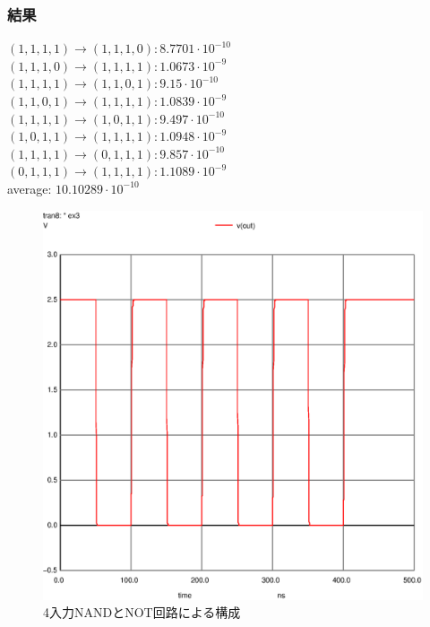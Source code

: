 \documentclass{jsarticle}
\begin{document}
\subsubsection{結果}
\begin{flushleft}
$(1,1,1,1) \rightarrow (1,1,1,0) : 8.7701 \cdot 10^{-10}$\\
$(1,1,1,0) \rightarrow (1,1,1,1) : 1.0673 \cdot 10^{-9}$\\
$(1,1,1,1) \rightarrow (1,1,0,1) : 9.15 \cdot 10^{-10}$\\
$(1,1,0,1) \rightarrow (1,1,1,1) : 1.0839 \cdot 10^{-9}$\\
$(1,1,1,1) \rightarrow (1,0,1,1) : 9.497 \cdot 10^{-10}$\\
$(1,0,1,1) \rightarrow (1,1,1,1) : 1.0948 \cdot 10^{-9}$\\
$(1,1,1,1) \rightarrow (0,1,1,1) : 9.857 \cdot 10^{-10}$\\
$(0,1,1,1) \rightarrow (1,1,1,1) : 1.1089 \cdot 10^{-9}$\\
average: $10.10289 \cdot 10^{-10}$

\end{flushleft}
\begin{figure}[H]
    \hspace{50pt}
    \includegraphics[scale=0.8]{ex3.ps}
    \vspace{30pt}
    \caption{4入力NANDとNOT回路による構成}
\end{figure}
\end{document}
